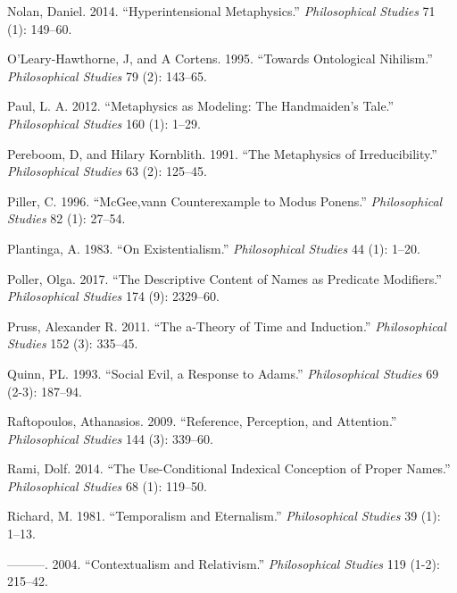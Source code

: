 \documentclass[
  10pt,
  letterpaper,
  DIV=11,
  numbers=noendperiod,
  twoside]{scrartcl}
\newlength{\cslhangindent}
\newenvironment{CSLReferences}[2] %
 {\begin{list}{}{%
  \setlength{\itemindent}{0pt}
  \setlength{\leftmargin}{0pt}
  \setlength{\parsep}{0pt}
  \ifodd #1
   \setlength{\leftmargin}{\cslhangindent}
   \setlength{\itemindent}{-1\cslhangindent}
  \fi
  \setlength{\itemsep}{#2\baselineskip}}}
 {\end{list}}
\begin{document}
\begin{CSLReferences}{1}{0}
Nolan, Daniel. 2014. {``Hyperintensional Metaphysics.''}
\emph{Philosophical Studies} 71 (1): 149--60.

O'Leary-Hawthorne, J, and A Cortens. 1995. {``Towards Ontological
Nihilism.''} \emph{Philosophical Studies} 79 (2): 143--65.

Paul, L. A. 2012. {``Metaphysics as Modeling: The Handmaiden's Tale.''}
\emph{Philosophical Studies} 160 (1): 1--29.

Pereboom, D, and Hilary Kornblith. 1991. {``The Metaphysics of
Irreducibility.''} \emph{Philosophical Studies} 63 (2): 125--45.

Piller, C. 1996. {``McGee,vann Counterexample to Modus Ponens.''}
\emph{Philosophical Studies} 82 (1): 27--54.

Plantinga, A. 1983. {``On Existentialism.''} \emph{Philosophical
Studies} 44 (1): 1--20.

Poller, Olga. 2017. {``The Descriptive Content of Names as Predicate
Modifiers.''} \emph{Philosophical Studies} 174 (9): 2329--60.

Pruss, Alexander R. 2011. {``The a-Theory of Time and Induction.''}
\emph{Philosophical Studies} 152 (3): 335--45.

Quinn, PL. 1993. {``Social Evil, a Response to Adams.''}
\emph{Philosophical Studies} 69 (2-3): 187--94.

Raftopoulos, Athanasios. 2009. {``Reference, Perception, and
Attention.''} \emph{Philosophical Studies} 144 (3): 339--60.

Rami, Dolf. 2014. {``The Use-Conditional Indexical Conception of Proper
Names.''} \emph{Philosophical Studies} 68 (1): 119--50.

Richard, M. 1981. {``Temporalism and Eternalism.''} \emph{Philosophical
Studies} 39 (1): 1--13.

---------. 2004. {``Contextualism and Relativism.''} \emph{Philosophical
Studies} 119 (1-2): 215--42.


\end{CSLReferences}
\end{document}
